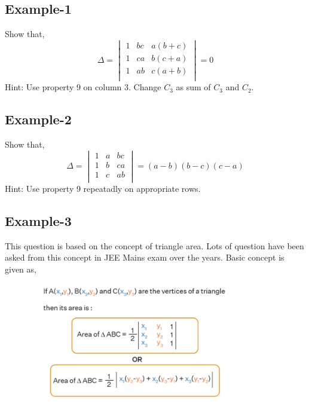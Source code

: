 \documentclass{article}
\begin{document}
\subsection*{Example-1}
Show that,
\begin{equation*}
    \Delta=
    \begin{vmatrix}
        1 & bc & a(b+c) \\
        1 & ca & b(c+a) \\
        1 & ab & c(a+b) \\
    \end{vmatrix}
    =0
\end{equation*}
Hint: Use property 9 on column 3. Change $C_3$ as sum of $C_3$ and $C_2$.
\subsection*{Example-2}
Show that,
\begin{equation*}
    \Delta=
    \begin{vmatrix}
        1 & a & bc \\
        1 & b & ca \\
        1 & c & ab \\
    \end{vmatrix}
    =(a-b)(b-c)(c-a)
\end{equation*}
Hint: Use property 9 repeatadly on appropriate rows.
\subsection*{Example-3}
This question is based on the concept of triangle area. Lots of question have been asked from this concept in JEE Mains exam over the years. Basic concept is given as,
\begin{figure}[H]
    
    \includegraphics[scale=0.7]{determinants_lec5_exa3.png}
\end{figure}
\end{document}
